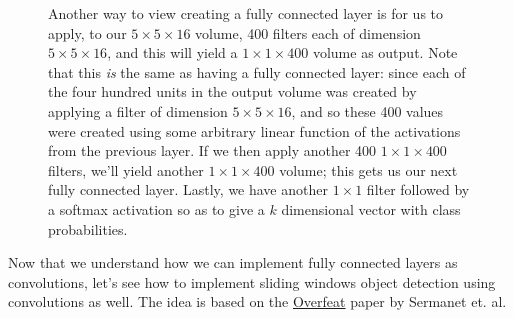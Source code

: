 \documentclass[12pt]{article}
\begin{document}
\begin{figure}[h]
  \caption{\footnotesize Another way to view creating a fully connected layer is for us to apply, to our $5 \times 5 \times 16$ volume, 400 filters each of dimension $5 \times 5 \times 16$, and this will yield a $1 \times 1 \times 400$ volume as output. Note that this \emph{is} the same as having a fully connected layer: since each of the four hundred units in the output volume was created by applying a filter of dimension $5 \times 5 \times 16$, and so these 400 values were created using some arbitrary linear function of the activations from the previous layer. If we then apply another 400 $1 \times 1 \times 400$ filters, we'll yield another $1\times 1 \times 400$ volume; this gets us our next fully connected layer. Lastly, we have another $1 \times 1$ filter followed by a softmax activation so as to give a $k$ dimensional vector with class probabilities.}
\end{figure}

Now that we understand how we can implement fully connected layers as convolutions, let's see how to implement sliding windows object detection using convolutions as well. The idea is based on the \href{https://arxiv.org/abs/1312.6229}{Overfeat} paper by Sermanet et. al.
\end{document}
